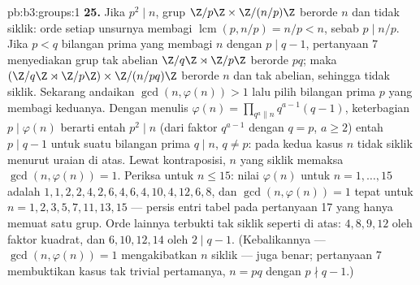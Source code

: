 \begin{solution}{pb:b3:groups:1}
\textbf{25.} Jika $p^2 \mid n$, grup $\Z/p\Z \times
\Z/(n/p)\Z$ berorde $n$ dan tidak siklik: orde setiap unsurnya
membagi $\operatorname{lcm}(p, n/p) = n/p < n$, sebab
$p \mid n/p$. Jika $p < q$ bilangan prima yang membagi $n$ dengan $p \mid
q - 1$, pertanyaan 7 menyediakan grup tak abelian $\Z/q\Z \rtimes
\Z/p\Z$ berorde $pq$; maka $(\Z/q\Z \rtimes \Z/p\Z) \times
\Z/(n/pq)\Z$ berorde $n$ dan tak abelian, sehingga tidak
siklik. Sekarang andaikan $\gcd(n, \varphi(n)) > 1$ lalu pilih bilangan prima
$p$ yang membagi keduanya. Dengan menulis $\varphi(n) = \prod_{q^a \parallel
n} q^{a-1}(q - 1)$, keterbagian $p \mid \varphi(n)$
berarti entah $p^2 \mid n$ (dari faktor $q^{a-1}$ dengan $q = p$,
$a \geq 2$) entah $p \mid q - 1$ untuk suatu bilangan prima $q \mid n$, $q
\neq p$: pada kedua kasus $n$ tidak siklik menurut uraian di atas. Lewat
kontraposisi, $n$ yang siklik memaksa $\gcd(n, \varphi(n)) = 1$.
Periksa untuk $n \leq 15$: nilai $\varphi(n)$ untuk $n = 1,
\dots, 15$ adalah $1, 1, 2, 2, 4, 2, 6, 4, 6, 4, 10, 4, 12, 6,
8$, dan $\gcd(n, \varphi(n)) = 1$ tepat untuk $n = 1, 2, 3, 5,
7, 11, 13, 15$ --- persis entri tabel pada
pertanyaan 17 yang hanya memuat satu grup. Orde lainnya
terbukti tak siklik seperti di atas: $4, 8, 9, 12$ oleh faktor
kuadrat, dan $6, 10, 12, 14$ oleh $2 \mid q - 1$. (Kebalikannya ---
$\gcd(n, \varphi(n)) = 1$ mengakibatkan $n$ siklik --- juga benar;
pertanyaan 7 membuktikan kasus tak trivial pertamanya, $n = pq$ dengan
$p \nmid q - 1$.)

\end{solution}
